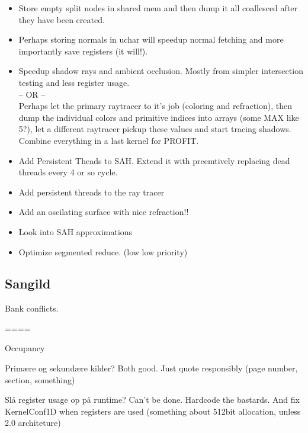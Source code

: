 \begin{itemize}
\item Store empty split nodes in shared mem and then dump it all
  coallesced after they have been created.
\item Perhaps storing normals in uchar will speedup normal fetching
  and more importantly save registers (it will!).
\item Speedup shadow rays and ambient occlusion. Mostly from simpler
  intersection testing and less register usage.\\ -- OR -- \\ Perhaps
  let the primary raytracer to it's job (coloring and refraction),
  then dump the individual colors and primitive indices into arrays
  (some MAX like 5?), let a different raytracer pickup these values
  and start tracing shadows. Combine everything in a last kernel for
  PROFIT.
\item Add Persistent Theads to SAH. Extend it with preemtively
  replacing dead threads every 4 or so cycle.
\item Add persistent threads to the ray tracer
\item Add an oscilating surface with nice refraction!!
\item Look into SAH approximations
\item Optimize segmented reduce. (low low priority)
\end{itemize}




\subsection*{Sangild}

Bank conflicts.

====

Occupancy

Primære og sekundære kilder? Both good. Just quote responsibly (page
number, section, something)

Slå register usage op på runtime? Can't be done. Hardcode the
bastards. And fix KernelConf1D when registers are used (something
about 512bit allocation, unless 2.0 architeture)
